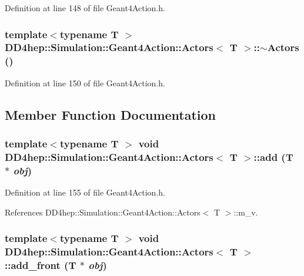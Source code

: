 Definition at line 148 of file Geant4Action.h.\hypertarget{class_d_d4hep_1_1_simulation_1_1_geant4_action_1_1_actors_a3c0f3b0099d834512cbdb13c9555c783}{
\subsubsection[{$\sim$Actors}]{\setlength{\rightskip}{0pt plus 5cm}template$<$typename T $>$ {\bf DD4hep::Simulation::Geant4Action::Actors}$<$ {\bf T} $>$::$\sim${\bf Actors} ()}}
\label{class_d_d4hep_1_1_simulation_1_1_geant4_action_1_1_actors_a3c0f3b0099d834512cbdb13c9555c783}


Definition at line 150 of file Geant4Action.h.

\subsection{Member Function Documentation}
\hypertarget{class_d_d4hep_1_1_simulation_1_1_geant4_action_1_1_actors_af07f7dfb10fad18b8580460f44c88f49}{
\subsubsection[{add}]{\setlength{\rightskip}{0pt plus 5cm}template$<$typename T $>$ void {\bf DD4hep::Simulation::Geant4Action::Actors}$<$ {\bf T} $>$::add ({\bf T} $\ast$ {\em obj})}}
\label{class_d_d4hep_1_1_simulation_1_1_geant4_action_1_1_actors_af07f7dfb10fad18b8580460f44c88f49}


Definition at line 155 of file Geant4Action.h.

References DD4hep::Simulation::Geant4Action::Actors$<$ T $>$::m\_\-v.\hypertarget{class_d_d4hep_1_1_simulation_1_1_geant4_action_1_1_actors_a024c3bcc6d543af13bf58066d245df9a}{
\subsubsection[{add\_\-front}]{\setlength{\rightskip}{0pt plus 5cm}template$<$typename T $>$ void {\bf DD4hep::Simulation::Geant4Action::Actors}$<$ {\bf T} $>$::add\_\-front ({\bf T} $\ast$ {\em obj})}}
\label{class_d_d4hep_1_1_simulation_1_1_geant4_action_1_1_actors_a024c3bcc6d543af13bf58066d245df9a}


